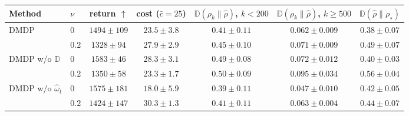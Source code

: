 \begin{tabular}{llccccc}
\toprule
Method & $\nu$ & return $\uparrow$ & cost ($\bar{c}=25$) & $\mathbb{D}(\rho_k\|\hat{\rho})$, $k<200$ & $\mathbb{D}(\rho_k\|\hat{\rho})$, $k\geq500$ & $\mathbb{D}(\hat{\rho}\|\rho_\star)$ \\
\midrule
DMDP & $0$ & $1494\pm109$ & $23.5\pm3.8$ & $0.41\pm0.11$ & $0.062\pm0.009$ & $0.38\pm0.07$ \\
 & $0.2$ & $1328\pm94$ & $27.9\pm2.9$ & $0.45\pm0.10$ & $0.071\pm0.009$ & $0.49\pm0.07$ \\
\midrule
DMDP w/o $\mathbb{D}$ & $0$ & $1583\pm46$ & $28.3\pm3.1$ & $0.49\pm0.08$ & $0.072\pm0.012$ & $0.40\pm0.03$ \\
 & $0.2$ & $1350\pm58$ & $23.3\pm1.7$ & $0.50\pm0.09$ & $0.095\pm0.034$ & $0.56\pm0.04$ \\
\midrule
DMDP w/o $\hat{\omega}_t$ & $0$ & $1575\pm181$ & $18.0\pm5.9$ & $0.39\pm0.11$ & $0.047\pm0.010$ & $0.42\pm0.05$ \\
 & $0.2$ & $1424\pm147$ & $30.3\pm1.3$ & $0.41\pm0.11$ & $0.063\pm0.004$ & $0.44\pm0.07$ \\
\bottomrule
\end{tabular}
